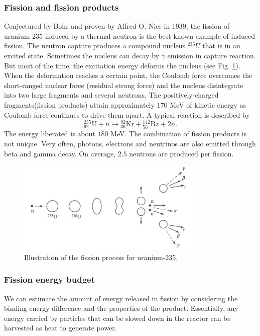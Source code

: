\documentclass[nofootinbib,preprint,aip,pra]{revtex4-1}
\begin{document}
        \subsubsection{Fission and fission products}
        Conjectured by Bohr and proven by Alfred O. Nier in 1939,
        the fission of uranium-235 induced by a thermal neutron
        is the best-known example of induced fission. 
        The neutron capture produces a compound nucleus ${}^{236}U$ that is in an excited state.
        Sometimes the nucleus can decay by $\gamma$ emission in capture reaction.
        But most of the time, the excitation energy deforms the nucleus (see Fig. \ref{fig:fission}).
        When the
        deformation reaches a certain point, the Coulomb force overcomes the short-ranged nuclear
        force (residual strong force) and the nucleus disintegrate into two large fragments and several neutrons. The
        positively-charged fragments(fission products) attain approximately $170$ MeV of kinetic energy as
        Coulomb force continues to drive them apart.\cite{l01}
        A typical reaction is described by
        \begin{equation}
        {}^{235}_{92}\text{U} + n \rightarrow {}^{92}_{36}\text{Kr} + {}^{142}_{56}\text{Ba} + 2 n.
        \end{equation}
        The energy liberated is about $180$ MeV. The combination of fission products is not
        unique. \cite{w98, gc01}
        Very often, photons, electrons and neutrinos are also emitted through beta and gamma decay.
        On average, $2.5$ neutrons are produced per fission.\cite{l01} 
        \begin{figure}[h]
            \centering
            \includegraphics[width=0.8\textwidth]{fission.png}
            \caption{Illustration of the fission process for uranium-235.\cite{l01}}
            \label{fig:fission}
        \end{figure}

        \subsubsection{Fission energy budget}
        We can estimate the amount of energy released in fission by considering the binding energy difference
        and the properties of the product. Essentially, any energy carried by particles that can be slowed down 
        in the reactor can be harvested as heat to generate power.
\end{document}
